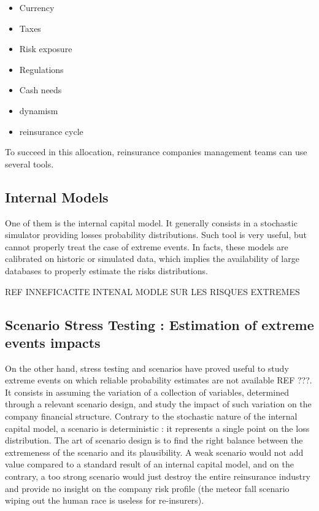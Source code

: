 \begin{itemize}
\itemsep0em 
\item Currency
\item Taxes
\item Risk exposure
\item Regulations
\item Cash needs
\item dynamism
\item reinsurance cycle
\end{itemize}

To succeed in this allocation, reinsurance companies management teams can use several tools.

\subsection{Internal Models}

One of them is the internal capital model. It generally consists in a stochastic simulator providing losses probability distributions. Such tool is very useful, but cannot properly treat the case of extreme events. In facts, these models are calibrated on historic or simulated data, which implies the availability of large databases to properly estimate the risks distributions.

REF INNEFICACITE INTENAL MODLE SUR LES RISQUES EXTREMES


\subsection{Scenario Stress Testing : Estimation of extreme events impacts}

On the other hand, stress testing and scenarios have proved useful to study extreme events on which reliable probability estimates are not available REF ???. It consists in assuming the variation of a collection of variables, determined through a relevant scenario design, and study the impact of such variation on the company financial structure. Contrary to the stochastic nature of the internal capital model, a scenario is deterministic : it represents a single point on the loss distribution. The art of scenario design is to find the right balance between the extremeness of the scenario  and its plausibility. A weak scenario would not add value compared to a standard result of an internal capital model, and on the contrary, a too strong scenario would just destroy the entire reinsurance industry and provide no insight on the company risk profile (the meteor fall scenario wiping out the human race is useless for re-insurers).

